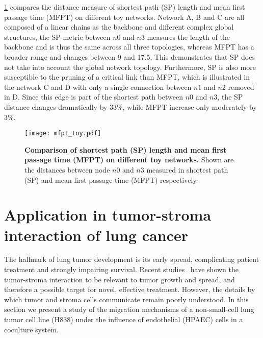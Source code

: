 \ref{fig:mfpt_toy} compares the distance measure of shortest path (SP) length
and mean first passage time (MFPT) on different toy networks. Network A, B and
C are all composed of a linear chains as the backbone and different complex 
global structures, the SP metric between $n0$ and $n3$ 
measures the length of the backbone and is 
thus the same across all three topologies, whereas MFPT has a broader range
and changes between 9 and 17.5. This demonstrates that SP does not take into
account the global network topology. Furthermore, SP is also more susceptible
to the pruning of a critical link than MFPT, which is illustrated in the 
network C and D with only a single connection between $n1$ and $n2$ removed
in D. Since this edge is part of the shortest path between $n0$ and $n3$, the
SP distance changes dramatically by 33\%, while MFPT increase only moderately
by 3\%.

\begin{figure}[!ht]
\begin{center}
\texttt{[image: mfpt\_toy.pdf]}
\end{center}
\caption[Toy example of SP and MFPT on different topologies]{
{\bf Comparison of shortest path (SP) length and mean first passage time 
(MFPT) on different toy networks.}
Shown are the distances between node $n0$ and $n3$ measured in shortest path 
(SP) and mean first passage time (MFPT) respectively.
}
\label{fig:mfpt_toy}
\end{figure}

\section{Application in tumor-stroma interaction of lung cancer}

The hallmark of lung tumor development is its early spread, 
complicating patient treatment and strongly impairing survival.
Recent studies~\citep{Mueller2004} have shown the tumor-stroma interaction to be relevant to 
tumor growth and spread, and therefore a possible target for
novel, effective treatment. 
However, 
the details by which tumor and stroma cells communicate remain poorly 
understood. In this section we present a study
of the migration mechanisms of a non-small-cell lung 
tumor cell line (H838) under the influence of endothelial (HPAEC) cells 
in a coculture system.

